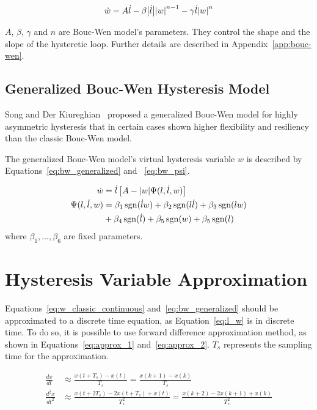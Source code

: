 \begin{align}
\dot{w} = A\dot{l} - \beta \abs{\dot{l}} \abs{w}^{n-1} - \gamma \dot{l} \abs{w}^n
\label{eq:w_classic_continuous}
\end{align}

$A$, $\beta$, $\gamma$ and $n$ are Bouc-Wen model's parameters.
They control the shape and the slope of the hysteretic loop.
Further details are described in Appendix~\ref{app:bouc-wen}.

\subsection{Generalized Bouc-Wen Hysteresis Model}
Song and Der Kiureghian~\cite{song2006generalized} proposed a generalized Bouc-Wen model for highly asymmetric
hysteresis that in certain cases shown higher flexibility
and resiliency than the classic Bouc-Wen model.

The generalized Bouc-Wen model's virtual hysteresis variable $w$
is described by Equations~\ref{eq:bw_generalized} and ~\ref{eq:bw_psi}.


\begin{align}
\dot{w} &= \dot{l} \left[A - \abs{w} \Psi(l, \dot{l}, w)\right] \label{eq:bw_generalized}\\
\Psi(l, \dot{l}, w) &= \beta_1 \operatorname{sgn}(\dot{l}w) + \beta_2 \operatorname{sgn}(l\dot{l}) + \beta_3 \operatorname{sgn}(lw) \nonumber \\
&+ \beta_4 \operatorname{sgn}(\dot{l}) + \beta_5 \operatorname{sgn}(w) + \beta_5 \operatorname{sgn}(l) \label{eq:bw_psi}
\end{align}
where $\beta_1,\ldots,\beta_6$ are fixed parameters.
\section{Hysteresis Variable Approximation}
Equations~\ref{eq:w_classic_continuous} and~\ref{eq:bw_generalized} should be approximated to a discrete time equation, as Equation~\ref{eq:l_w} is in discrete time. To do so, it is possible to use forward
difference approximation method, as shown in Equations~\ref{eq:approx_1} and~\ref{eq:approx_2}. $T_s$ represents the sampling time for the approximation.

\begin{align}
\frac{dx}{dt} &\approx \frac{x(t+T_s) - x(t)}{T_s} = \frac{x(k+1) - x(k)}{T_s} \label{eq:approx_1}\\
\frac{d^2x}{dt^2} &\approx \frac{x(t+2T_s) - 2x(t+T_s) + x(t)}{T_s^{2}} =
\frac{x(k+2)-2x(k+1)+x(k)}{T_s^2} \label{eq:approx_2}
\end{align}

